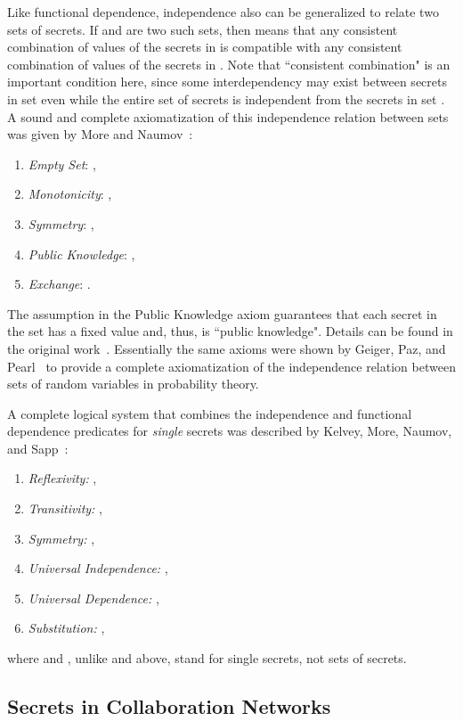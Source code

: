 \documentclass{llncs}
\begin{document}
Like functional dependence, independence also can be generalized to relate two sets of secrets. If  and  are two such sets, then  means that any consistent combination of values of the secrets in  is compatible with any consistent combination of values of the secrets in . Note that ``consistent combination" is an important condition here, since some interdependency may exist between secrets in set  even while the entire set of secrets  is independent from the secrets in set . A sound and complete axiomatization of this independence relation between sets was given by More and Naumov~\cite{mn10}:
\begin{enumerate}
\item {\em Empty Set}: ,
\item {\em Monotonicity}: ,
\item {\em Symmetry}: ,
\item {\em Public Knowledge}: ,
\item {\em Exchange}: .
\end{enumerate}
The assumption  in the Public Knowledge axiom guarantees that each secret in the set  has a fixed value and, thus, is ``public knowledge". Details can be found in the original work~\cite{mn10}. Essentially the same axioms were shown by Geiger, Paz, and Pearl~\cite{gpp91} to provide a complete axiomatization of the independence relation between sets of random variables in probability theory. 

A complete logical system that combines the independence and functional dependence predicates for {\em single} secrets was described by Kelvey, More, Naumov, and Sapp~\cite{kmns10}:
\begin{enumerate}
\item {\em Reflexivity:} ,
\item {\em Transitivity:} ,
\item {\em Symmetry:} ,
\item {\em Universal Independence:} , 
\item {\em Universal Dependence:} ,
\item {\em Substitution:} ,
\end{enumerate}
where  and , unlike  and  above, stand for single secrets, not sets of secrets.

\subsection{Secrets in Collaboration Networks}
\end{document}
